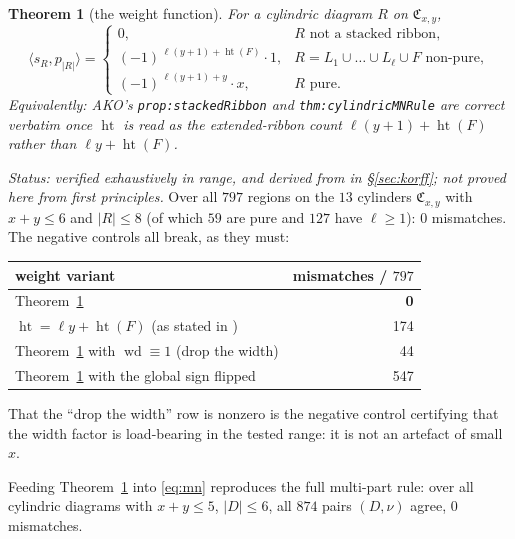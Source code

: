 \documentclass[11pt]{article}
\theoremstyle{plain}
\newtheorem{theorem}{Theorem}
\theoremstyle{definition}
\theoremstyle{remark}
\DeclareMathOperator{\hgt}{ht}
\DeclareMathOperator{\wdt}{wd}
\newcommand{\CC}{\mathfrak{C}}
\begin{document}
\begin{theorem}[the weight function]\label{thm:weight}
For a cylindric diagram $R$ on $\CC_{x,y}$,
\[
  \langle s_R,p_{|R|}\rangle=
  \begin{cases}
    0, & R \text{ not a stacked ribbon},\\
    (-1)^{\,\ell(y+1)+\hgt(F)}\cdot 1, & R=L_1\cup\dots\cup L_\ell\cup F \text{ non-pure},\\
    (-1)^{\,\ell(y+1)+y}\cdot x, & R \text{ pure}.
  \end{cases}
\]
Equivalently: AKO's \texttt{prop:stackedRibbon} and \texttt{thm:cylindricMNRule} are correct verbatim
once $\hgt$ is read as the extended-ribbon count $\ell(y+1)+\hgt(F)$ rather than $\ell y+\hgt(F)$.
\end{theorem}

\emph{Status: verified exhaustively in range, and derived from \cite{K19} in \S\ref{sec:korff};
not proved here from first principles.} Over all $797$ regions on the $13$ cylinders $\CC_{x,y}$ with
$x+y\le6$ and $|R|\le8$ (of which $59$ are pure and $127$ have $\ell\ge1$): $0$ mismatches. The
negative controls all break, as they must:

\begin{center}
\begin{tabular}{lr}
\hline
weight variant & mismatches / $797$\\
\hline
Theorem~\ref{thm:weight} & \textbf{0}\\
$\hgt=\ell y+\hgt(F)$ (as stated in \cite{AKO}) & 174\\
Theorem~\ref{thm:weight} with $\wdt\equiv1$ (drop the width) & 44\\
Theorem~\ref{thm:weight} with the global sign flipped & 547\\
\hline
\end{tabular}
\end{center}

That the ``drop the width'' row is nonzero is the negative control certifying that the width factor is
load-bearing in the tested range: it is not an artefact of small $x$.

Feeding Theorem~\ref{thm:weight} into \eqref{eq:mn} reproduces the full multi-part rule:
over all cylindric diagrams with $x+y\le5$, $|D|\le6$, all $874$ pairs $(D,\nu)$ agree, $0$ mismatches.
\end{document}
